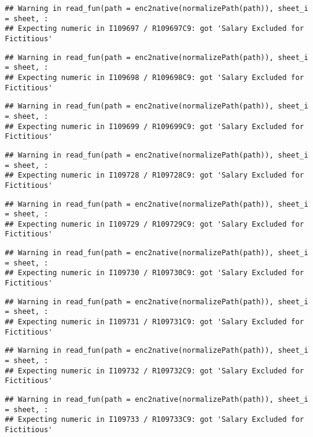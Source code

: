 \documentclass[
]{article}
\begin{document}
\begin{verbatim}
## Warning in read_fun(path = enc2native(normalizePath(path)), sheet_i = sheet, :
## Expecting numeric in I109697 / R109697C9: got 'Salary Excluded for Fictitious'
\end{verbatim}

\begin{verbatim}
## Warning in read_fun(path = enc2native(normalizePath(path)), sheet_i = sheet, :
## Expecting numeric in I109698 / R109698C9: got 'Salary Excluded for Fictitious'
\end{verbatim}

\begin{verbatim}
## Warning in read_fun(path = enc2native(normalizePath(path)), sheet_i = sheet, :
## Expecting numeric in I109699 / R109699C9: got 'Salary Excluded for Fictitious'
\end{verbatim}

\begin{verbatim}
## Warning in read_fun(path = enc2native(normalizePath(path)), sheet_i = sheet, :
## Expecting numeric in I109728 / R109728C9: got 'Salary Excluded for Fictitious'
\end{verbatim}

\begin{verbatim}
## Warning in read_fun(path = enc2native(normalizePath(path)), sheet_i = sheet, :
## Expecting numeric in I109729 / R109729C9: got 'Salary Excluded for Fictitious'
\end{verbatim}

\begin{verbatim}
## Warning in read_fun(path = enc2native(normalizePath(path)), sheet_i = sheet, :
## Expecting numeric in I109730 / R109730C9: got 'Salary Excluded for Fictitious'
\end{verbatim}

\begin{verbatim}
## Warning in read_fun(path = enc2native(normalizePath(path)), sheet_i = sheet, :
## Expecting numeric in I109731 / R109731C9: got 'Salary Excluded for Fictitious'
\end{verbatim}

\begin{verbatim}
## Warning in read_fun(path = enc2native(normalizePath(path)), sheet_i = sheet, :
## Expecting numeric in I109732 / R109732C9: got 'Salary Excluded for Fictitious'
\end{verbatim}

\begin{verbatim}
## Warning in read_fun(path = enc2native(normalizePath(path)), sheet_i = sheet, :
## Expecting numeric in I109733 / R109733C9: got 'Salary Excluded for Fictitious'
\end{verbatim}
\end{document}
